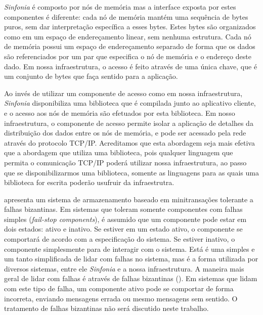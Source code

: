 \documentclass[11pt,twoside,a4paper]{book}
\begin{document}
\emph{Sinfonia} é composto por nós de memória mas a interface exposta por estes componentes é diferente: cada nó de memória mantém uma sequência de bytes puros, sem dar interpretação específica a esses bytes. Estes bytes são organizados como em um espaço de endereçamento linear, sem nenhuma estrutura. Cada nó de memória possui um espaço de endereçamento separado de forma que os dados são referenciados por um par que especifica o nó de memória e o endereço deste dado. Em nossa infraestrutura, o acesso é feito através de uma única chave, que é um conjunto de bytes que faça sentido para a aplicação.

Ao invés de utilizar um componente de acesso como em nossa infraestrutura, \emph{Sinfonia} disponibiliza uma biblioteca que é compilada junto ao aplicativo cliente, e o acesso aos nós de memória são efetuados por esta biblioteca. Em nosso infraestrutura, o componente de acesso permite isolar a aplicação de detalhes da distribuição dos dados entre os nós de memória, e pode ser acessado pela rede através do protocolo TCP/IP. Acreditamos que esta abordagem seja mais efetiva que a abordagem que utiliza uma biblioteca, pois qualquer linguagem que permita o comunicação TCP/IP poderá utilizar nossa infraestrutura, ao passo que se disponibilizarmos uma biblioteca, somente as linguagens para as quais uma biblioteca for escrita poderão usufruir da infraestrutra.

\cite{padilha} apresenta um sistema de armazenamento baseado em minitransações tolerante a falhas bizantinas. Em sistemas que toleram somente componentes com falhas simples (\emph{fail-stop components}), é assumido que um componente pode estar em dois estados: ativo e inativo. Se estiver em um estado ativo, o componente se comportará de acordo com a especificação do sistema. Se estiver inativo, o componente simplesmente para de interagir com o sistema. Está é uma simples e um tanto simplificada de lidar com falhas no sistema, mas é a forma utilizada por diversos sistemas, entre ele \emph{Sinfonia} e a nossa infraestrutura. A maneira mais geral de lidar com falhas é através de falhas bizantinas (\cite{byzantine}). Em sistemas que lidam com este tipo de falha, um componente ativo pode se comportar de forma incorreta, enviando mensagens errada ou mesmo mensagens sem sentido. O tratamento de falhas bizantinas não será discutido neste trabalho.
\end{document}
